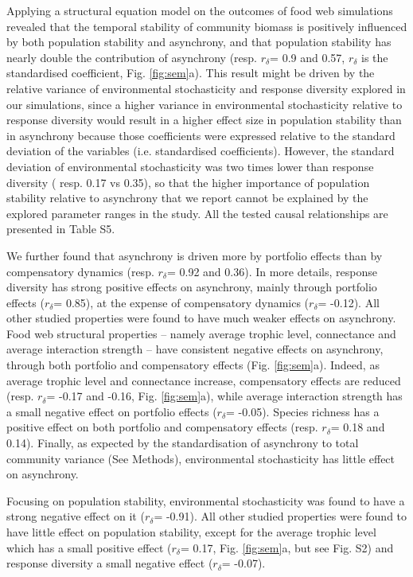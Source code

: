 \documentclass[
]{article}
\begin{document}
Applying a structural equation model on the outcomes of food web simulations
revealed that the temporal stability of community biomass is positively
influenced by both population stability and asynchrony, and that population
stability has nearly double the contribution of asynchrony (resp. \(r_\delta\)=
0.9 and 0.57, \(r_\delta\) is the standardised coefficient, Fig.
\ref{fig:sem}a). This result might be driven
by the relative variance of environmental stochasticity and response diversity
explored in our simulations, since a higher variance in environmental
stochasticity relative to response diversity would result in a higher effect
size in population stability than in asynchrony because those coefficients were
expressed relative to the standard deviation of the variables (i.e.
standardised coefficients). However, the standard deviation of environmental
stochasticity was two times lower than response diversity ( resp.
0.17 vs
0.35), so that the higher importance of
population stability relative to asynchrony that we report cannot be explained
by the explored parameter ranges in the study. All the tested causal
relationships are presented in Table S5.

We further found that asynchrony is driven more by portfolio effects than by
compensatory dynamics (resp. \(r_\delta\)= 0.92 and 0.36). In more details, response
diversity has strong positive effects on asynchrony, mainly through portfolio
effects (\(r_\delta\)= 0.85), at the expense of compensatory dynamics
(\(r_\delta\)= -0.12). All other studied properties were found to have much
weaker effects on asynchrony. Food web structural properties -- namely average
trophic level, connectance and average interaction strength -- have consistent
negative effects on asynchrony,
through both portfolio and compensatory effects (Fig. \ref{fig:sem}a). Indeed, as average
trophic level and connectance increase, compensatory effects are reduced (resp.
\(r_\delta\)= -0.17 and -0.16, Fig. \ref{fig:sem}a), while average
interaction strength has a small
negative effect on portfolio effects (\(r_\delta\)= -0.05). Species richness has a
positive effect on both portfolio and compensatory effects (resp. \(r_\delta\)= 0.18 and
0.14). Finally, as expected by the standardisation of asynchrony to total
community variance (See Methods), environmental stochasticity has little effect
on asynchrony.

Focusing on population stability, environmental stochasticity was found to have
a strong negative effect on it (\(r_\delta\)= -0.91). All other studied properties were
found to have little effect on population stability, except for the average
trophic level which has a small positive effect (\(r_\delta\)= 0.17, Fig.
\ref{fig:sem}a, but see Fig. S2) and response diversity a small negative effect
(\(r_\delta\)= -0.07).
\end{document}
